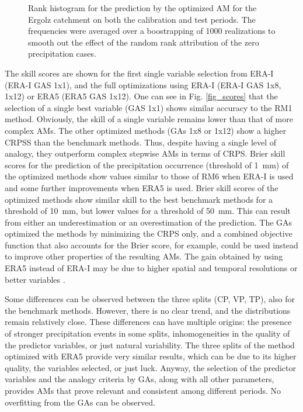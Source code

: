 \documentclass[draft]{agujournal2019}
\begin{document}
\begin{figure}[hbt]
	\noindent{}
	\caption{Rank histogram for the prediction by the optimized AM for the Ergolz catchment on both the calibration and test periods. The frequencies were averaged over a boostrapping of 1000 realizations to smooth out the effect of the random rank attribution of the zero precipitation cases.}
	\label{rank_histogram}
\end{figure}

The skill scores are shown for the first single variable selection from ERA-I (ERA-I GAS 1x1), and the full optimizations using ERA-I (ERA-I GAS 1x8, 1x12) or ERA5 (ERA5 GAS 1x12). One can see in Fig. \ref{fig_scores} that the selection of a single best variable (GAS 1x1) shows similar accuracy to the RM1 method. Obviously, the skill of a single variable remains lower than that of more complex AMs. The other optimized methods (GAs 1x8 or 1x12) show a higher CRPSS than the benchmark methods. Thus, despite having a single level of analogy, they outperform complex stepwise AMs in terms of CRPS. Brier skill scores for the prediction of the precipitation occurrence (threshold of 1~mm) of the optimized methods show values similar to those of RM6 when ERA-I is used and some further improvements when ERA5 is used. Brier skill scores of the optimized methods show similar skill to the best benchmark methods for a threshold of 10~mm, but lower values for a threshold of 50~mm. This can result from either an underestimation or an overestimation of the prediction. The GAs optimized the methods by minimizing the CRPS only, and a combined objective function that also accounts for the Brier score, for example, could be used instead to improve other properties of the resulting AMs. The gain obtained by using ERA5 instead of ERA-I may be due to higher spatial and temporal resolutions or better variables \cite{Horton2021}. 

Some differences can be observed between the three splits (CP, VP, TP), also for the benchmark methods. However, there is no clear trend, and the distributions remain relatively close. These differences can have multiple origins: the presence of stronger precipitation events in some splits, inhomogeneities in the quality of the predictor variables, or just natural variability. The three splits of the method optimized with ERA5 provide very similar results, which can be due to its higher quality, the variables selected, or just luck. Anyway, the selection of the predictor variables and the analogy criteria by GAs, along with all other parameters, provides AMs that prove relevant and consistent among different periods. No overfitting from the GAs can be observed.
\end{document}
